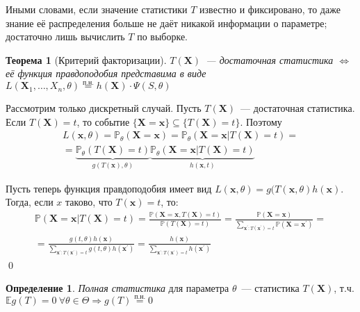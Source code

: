 \documentclass[oneside,final,14pt]{extreport}
\renewenvironment{proof}{{\bfseries Доказательство.}}{\qed}
\newtheorem{thm}{Теорема}[section]
\theoremstyle{definition}
\newtheorem{defn}{Определение}[section]
\begin{document}
Иными словами, если значение статистики $T$ известно и фиксировано, то даже знание её распределения больше не даёт никакой информации о параметре; достаточно лишь вычислить $T$ по выборке.

\begin{thm}[Критерий факторизации]
$T(\mathbf{X})$~--- достаточная статистика $\Leftrightarrow$ её функция правдоподобия представима в виде $L(\mathbf{X}_{1}, \ldots, X_{n} , \theta) \stackrel{\text{п.н.}}{=} h(\mathbf{X}) \cdot \Psi(S, \theta)$
\end{thm}

\begin{proof}
Рассмотрим только дискретный случай. Пусть $T(\mathbf{X})$~--- достаточная статистика. Если $T(\mathbf{X})=t$, то событие $\{\mathbf{X}=\mathbf{x}\} \subseteq \{T(\mathbf{X})=t\}$. Поэтому
\begin{multline*}
    L(\mathbf{x}, \theta) = \mathbb{P}_{\theta}(\mathbf{X}=\mathbf{x})=\mathbb{P}_{\theta}(\mathbf{X}=\mathbf{x} | T(\mathbf{X})=t) =\\
    = \underbrace{\mathbb{P}_{\theta}(T(\mathbf{X})=t)}_{g(T(\mathbf{x}), \theta)} \underbrace{\mathbb{P}_{\theta}(\mathbf{X}=\mathbf{x} | T(\mathbf{X})=t)}_{h(\mathbf{x}, t)}
\end{multline*}

Пусть теперь функция правдоподобия имеет вид $L(\mathbf{x}, \theta)=g(T(\mathbf{x}, \theta) h(\mathbf{x})$. Тогда, если $x$ таково, что $T(\mathbf{x})=t$, то:
\begin{multline*}
    \mathbb{P}(\mathbf{X}=\mathbf{x} | T(\mathbf{X})=t) =\frac{\mathbb{P}(\mathbf{X}=\mathbf{x}, T(\mathbf{X})=t)}{\mathbb{P}(T(\mathbf{X})=t)}
    =\frac{\mathbb{P}(\mathbf{X}=\mathbf{x})}{\sum_{\mathbf{x}^{\prime}: T(\mathbf{x}^{\prime})=t} \mathbb{P}(\mathbf{X}=\mathbf{x}^{\prime})} = \\
    = \frac{g(t, \theta) h(\mathbf{x})}{\sum_{\mathbf{x}^{\prime}: T(\mathbf{x}^{\prime})=t} g(t, \theta) h(\mathbf{x}^{\prime})}
    = \frac{h(\mathbf{x})}{\sum\limits_{\mathbf{x}^{\prime}: T(\mathbf{x}^{\prime})=t} h(\mathbf{x}^{\prime})}
\end{multline*}
\end{proof}

\begin{defn}
{\it Полная статистика} для параметра $\theta$~--- статистика $T(\mathbf{X})$, т.ч. $\mathbb{E} g(T)=0~\forall \theta \in \Theta \Rightarrow g(T) \stackrel{\text{п.н.}}{=}0$
\end{defn}
\end{document}
